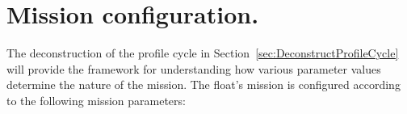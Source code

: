 %
%
%
%
%
%
%
%
%
%

\newcommand{\cs}{Configuration Supervisor}

\section{Mission configuration.}
\label{sec:MissionConfiguration}

The deconstruction of the profile cycle in
Section~\ref{sec:DeconstructProfileCycle} will provide the framework for
understanding how various parameter values determine the nature of the
mission. The float's mission is configured according to the following
mission parameters:

